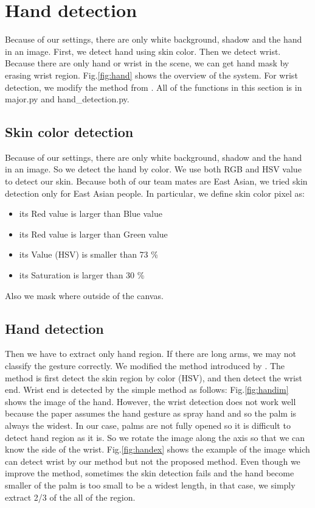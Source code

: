 \section{Hand detection}
Because of our settings, there are only white background, shadow and the hand in an image.
First, we detect hand using skin color. Then we detect wrist. Because there are only hand or wrist in the scene, we can get hand mask by erasing wrist region. Fig.\ref{fig:hand} shows the overview of the system. For wrist detection, we modify the method from \cite{ra11}.
All of the functions in this section is in major.py and hand\_detection.py.
\subsection{Skin color detection}
Because of our settings, there are only white background, shadow and the hand in an image.
So we detect the hand by color. We use both RGB and HSV value to detect our skin.
Because both of our team mates are East Asian, we tried skin detection only for East Asian people.
In particular, we define skin color pixel as:
\begin{itemize}
  \item its Red value is larger than Blue value
  \item its Red value is larger than Green value
  \item its Value (HSV) is smaller than 73 \%
  \item its Saturation is larger than 30 \%
 \end{itemize}
Also we mask where outside of the canvas.
\subsection{Hand detection}
Then we have to extract only hand region. If there are long arms, we may not classify the gesture correctly. We modified the method introduced by \cite{ra11}. The method is first detect the skin region by color (HSV), and then detect the wrist end. Wrist end is detected by the simple method as follows:
Fig.\ref{fig:handim} shows the image of the hand. 
However, the wrist detection does not work well because the paper assumes the hand gesture as spray hand and so the palm is always the widest. 
In our case, palms are not fully opened so it is difficult to detect hand region as it is. 
So we rotate the image along the axis so that we can know the side of the wrist. 
Fig.\ref{fig:handex} shows the example of the image which can detect wrist by our method but not the proposed method.
Even though we improve the method, sometimes the skin detection fails and the hand become smaller of the palm is too small to be a widest length, in that case, we simply extract 2/3 of the all of the region.

